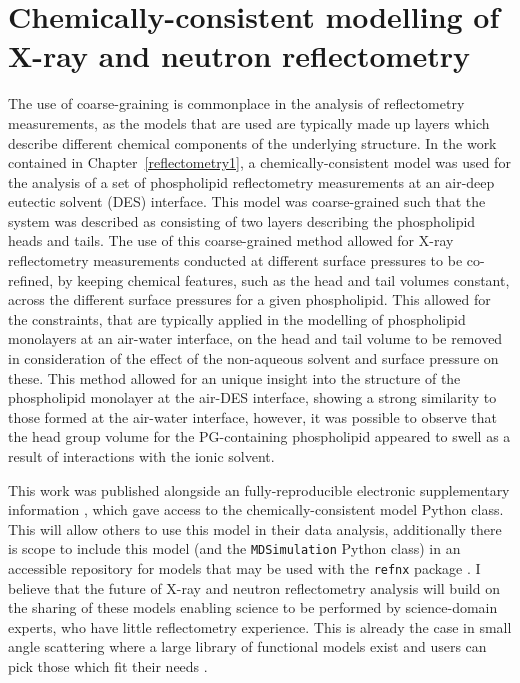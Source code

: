 \section{Chemically-consistent modelling of X-ray and neutron reflectometry}
The use of coarse-graining is commonplace in the analysis of reflectometry measurements, as the models that are used are typically made up layers which describe different chemical components of the underlying structure.
In the work contained in Chapter~\ref{reflectometry1}, a chemically-consistent model was used for the analysis of a set of phospholipid reflectometry measurements at an air-deep eutectic solvent (DES) interface.
This model was coarse-grained such that the system was described as consisting of two layers describing the phospholipid heads and tails.
The use of this coarse-grained method allowed for X-ray reflectometry measurements conducted at different surface pressures to be co-refined, by keeping chemical features, such as the head and tail volumes constant, across the different surface pressures for a given phospholipid.
This allowed for the constraints, that are typically applied in the modelling of phospholipid monolayers at an air-water interface, on the head and tail volume to be removed in consideration of the effect of the non-aqueous solvent and surface pressure on these.
This method allowed for an unique insight into the structure of the phospholipid monolayer at the air-DES interface, showing a strong similarity to those formed at the air-water interface, however, it was possible to observe that the head group volume for the PG-containing phospholipid appeared to swell as a result of interactions with the ionic solvent.

This work was published alongside an fully-reproducible electronic supplementary information \cite{mccluskey_bayesian_2019,mccluskey_lipids_at_airdes_2019}, which gave access to the chemically-consistent model Python class.
This will allow others to use this model in their data analysis, additionally there is scope to include this model (and the \texttt{MDSimulation} Python class) in an accessible repository for models that may be used with the \texttt{refnx} package \cite{nelson_refnx_2019,nelson_refnx_2019-1,nelson_refnx-models_nodate}.
I believe that the future of X-ray and neutron reflectometry analysis will build on the sharing of these models enabling science to be performed by science-domain experts, who have little reflectometry experience.
This is already the case in small angle scattering where a large library of functional models exist and users can pick those which fit their needs \cite{noauthor_sasfit_nodate,noauthor_sasview_nodate}.

